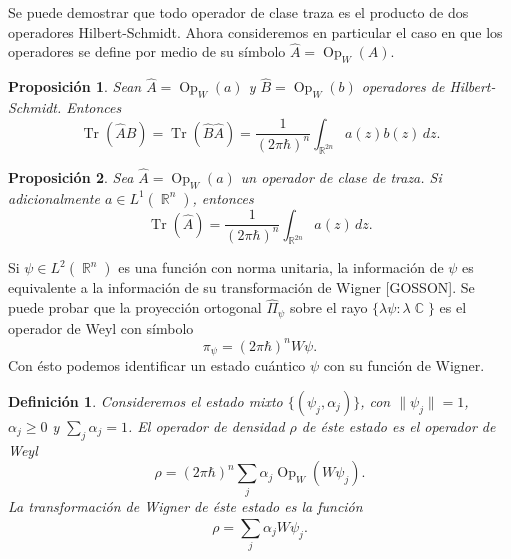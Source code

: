 \documentclass[a4paper]{report}
\DeclareMathOperator{\R}{\mathbb{R}}
\DeclareMathOperator{\C}{\mathbb{C}}
\DeclareMathOperator{\Tr}{Tr}
\DeclareMathOperator{\Op}{Op}
\newtheorem{definition}{Definición}
\newtheorem{proposition}{Proposición}
\begin{document}
  Se puede demostrar que todo operador de clase traza es el
  producto de dos operadores Hilbert-Schmidt. Ahora
  consideremos en particular el caso en que los operadores
  se define por medio de su símbolo $\hat{A} = \Op_W(A)$.

  \begin{proposition}
    Sean $\hat{A} = \Op_W(a)$ y $\hat{B} = \Op_W(b)$
    operadores de Hilbert-Schmidt. Entonces
    \begin{equation}
      \Tr\left( \hat{A}\hat{B} \right) 
      = \Tr\left( \hat{B}\hat{A} \right) 
      = \frac{1}{(2\pi\hbar)^{n}} \int_{\R^{2n}} a(z)b(z) \,
      dz.
    \end{equation}
  \end{proposition}

  \begin{proposition}
    Sea $\hat{A} = \Op_W(a)$ un operador de clase de traza.
    Si adicionalmente $a \in L^{1}(\R^{n})$, entonces
    \begin{equation}
      \Tr\left( \hat{A} \right) 
      = \frac{1}{(2\pi\hbar)^{n}} \int_{\R^{2n}} a(z) \, dz.
    \end{equation}
  \end{proposition}

  Si $\psi \in L^2(\R^{n})$ es una función con norma
  unitaria, la información de $\psi$ es equivalente a la
  información de su transformación de Wigner [GOSSON]. Se
  puede probar que la proyección ortogonal $\hat{\Pi}_\psi$ 
  sobre el rayo $\{\lambda \psi : \lambda \C\}$ es el
  operador de Weyl con símbolo
  \[
    \pi_\psi = (2\pi\hbar)^{n}W\psi.
  \] 
  Con ésto podemos identificar un estado cuántico $\psi$ con
  su función de Wigner.

  \begin{definition}
    Consideremos el estado mixto $\{(\psi_j,\alpha_j)\}$,
    con $\|\psi_j\| = 1$, $\alpha_j \geq 0$ y $\sum_{j}^{}
    \alpha_j = 1$. El operador de densidad $\rho$ de
    éste estado es el operador de Weyl
    \begin{equation}
      \rho
      = (2\pi\hbar)^{n} \sum_{j}^{} \alpha_j \Op_W(W\psi_j).
    \end{equation}
    La transformación de Wigner de éste estado es la función
    \begin{equation}
      \rho = \sum_{j}^{} \alpha_j W\psi_j.
    \end{equation}
  \end{definition}
\end{document}
